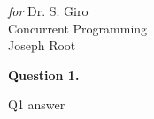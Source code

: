 \documentclass[a4paper,11pt,english]{article}
\begin{document}
	
	\begin{centering}
		\small \emph{for} Dr. S. Giro \\ [0.2cm]
		\minionfont\Large Concurrent Programming \\ [0.1cm]
		\large Joseph Root \\ [1.2cm]
	\end{centering}
	\noindent
			
	\vspace{0.5cm}
	\noindent \textbf{Question 1.}
	
	\noindent Q1 answer
		
		
	
\end{document}
